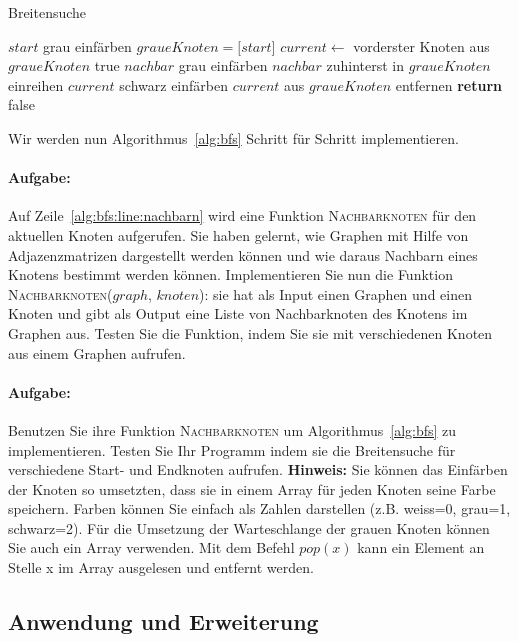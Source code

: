 \begin{algorithm}
\caption{Breitensuche}\label{alg:bfs}
\begin{algorithmic}[1]
	\State $start$ grau einf\"arben
   \State $graue Knoten = \lbrack start\rbrack$
   	\State $current \gets$ vorderster Knoten aus $graueKnoten$
   		\Return true
   	\EndIf
	\label{alg:bfs:line:nachbarn}
		 	\State $nachbar$ grau einf\"arben
			\State $nachbar$ zuhinterst in $graueKnoten$ einreihen
		\EndIf
	\EndFor
	\State $current$ schwarz einf\"arben
	\State $current$ aus $graueKnoten$ entfernen
   \EndWhile\label{euclidendwhile}
   \State \textbf{return} false
\EndProcedure
\end{algorithmic}
\end{algorithm}

Wir werden nun Algorithmus~\ref{alg:bfs} Schritt f\"ur Schritt implementieren. 

\paragraph{Aufgabe:}Auf Zeile~\ref{alg:bfs:line:nachbarn} wird eine Funktion \textsc{Nachbarknoten} f\"ur den aktuellen Knoten aufgerufen. Sie haben gelernt, wie Graphen mit Hilfe von Adjazenzmatrizen dargestellt werden k\"onnen und wie daraus Nachbarn eines Knotens bestimmt werden k\"onnen. Implementieren Sie nun die Funktion \textsc{Nachbarknoten($graph$, $knoten$)}: sie hat als Input einen Graphen und einen Knoten und gibt als Output eine Liste von Nachbarknoten des Knotens im Graphen aus. Testen Sie die Funktion, indem Sie sie mit verschiedenen Knoten aus einem Graphen aufrufen.

\paragraph{Aufgabe:}Benutzen Sie ihre Funktion \textsc{Nachbarknoten} um Algorithmus~\ref{alg:bfs} zu implementieren. Testen Sie Ihr Programm indem sie die Breitensuche f\"ur verschiedene Start- und Endknoten aufrufen. \textbf{Hinweis:} Sie k\"onnen das Einf\"arben der Knoten so umsetzten, dass sie in einem Array f\"ur jeden Knoten seine Farbe speichern. Farben k\"onnen Sie einfach als Zahlen darstellen (z.B. weiss=0, grau=1, schwarz=2). F\"ur die Umsetzung der Warteschlange der grauen Knoten k\"onnen Sie auch ein Array verwenden. Mit dem Befehl $pop(x)$ kann ein Element an Stelle x im Array ausgelesen und entfernt werden.

\subsection{Anwendung und Erweiterung}
